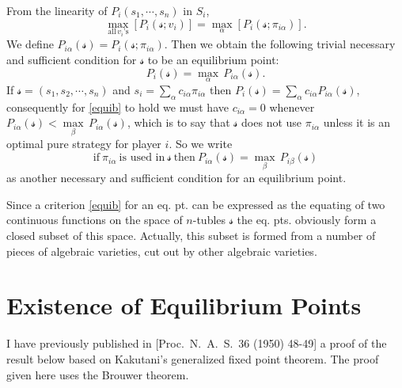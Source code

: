    From the linearity of $P_i (s_1,\cdots ,s_n )$ in $S_i $, 
   \begin{equation}
       \underset{\text{all} \, v_i \text{'s} }{\operatorname{max}} \left[ P_i (\mathcal{s} ;v_i ) \right] = \underset{\alpha }{\operatorname{max}} \left[ P_i (\mathcal{s} ;\pi_{i\alpha }) \right] .
   \end{equation}
   We define $P_{i\alpha }(\mathcal{s} )=P_i (\mathcal{s} ;\pi_{i\alpha })$. Then we obtain the following trivial necessary and sufficient condition for $\mathcal{s} $ to be an equilibrium point: 
   \begin{equation}\label{equib}
       P_i (\mathcal{s} )= \underset{\alpha }{\operatorname{max}} \, P_{i\alpha }(\mathcal{s} ).
   \end{equation}
   If $\mathcal{s} =(s_1,s_2,\cdots ,s_n )$ and $s_i =\sum_{\alpha }^{} c_{i\alpha }\pi_{i\alpha }$ then $P_i (\mathcal{s} )=\sum_{\alpha }^{} c_{i\alpha }P_{i\alpha }(\mathcal{s} )$, consequently for \eqref{equib} to hold we must have $c_{i\alpha }=0$ whenever $P_{i\alpha }(\mathcal{s} )< \underset{\beta }{\operatorname{max}} \, P_{i\alpha }(\mathcal{s} )  $, which is to say that $\mathcal{s} $ does not use $\pi_{i\alpha }$ unless it is an optimal pure strategy for player $i$. So we write 
   \begin{equation}\label{suf}
       \text{if} \ \pi_{i\alpha } \ \text{is used in} \ \mathcal{s} \ \text{then} \ P_{i\alpha }(\mathcal{s} )=\underset{\beta }{\operatorname{max}} \, P_{i\beta }(\mathcal{s} )
   \end{equation}
   as another necessary and sufficient condition for an equilibrium point.

   Since a criterion \eqref{equib} for an eq. pt. can be expressed as the equating of two continuous functions on the space of $n$-tubles $\mathcal{s} $ the eq. pts. obviously form a closed subset of this space. Actually, this subset is formed from a number of pieces of algebraic varieties, cut out by other algebraic varieties.

   \section{Existence of Equilibrium Points}
   I have previously published in [Proc.\ N.\ A.\ S.\ 36 (1950) 48-49] \cite{2} a proof of the result below based on Kakutani's generalized fixed point theorem. The proof given here uses the Brouwer theorem.

